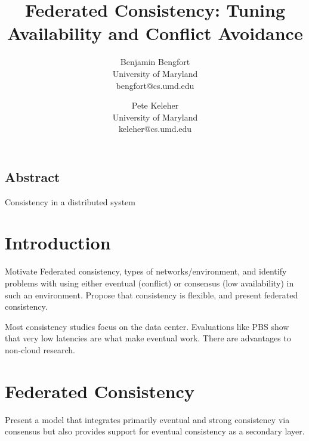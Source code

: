 \documentclass[letterpaper,twocolumn,10pt]{article}
\begin{document}
\date{}

\title{\Large \bf Federated Consistency: Tuning Availability and Conflict Avoidance}

\author{
{\rm Benjamin Bengfort}\\
University of Maryland\\
bengfort@cs.umd.edu
\and
{\rm Pete Keleher}\\
University of Maryland\\
keleher@cs.umd.edu
} %

\maketitle



\subsection*{Abstract}

Consistency in a distributed system

\section{Introduction}

Motivate Federated consistency, types of networks/environment, and identify problems with using either eventual (conflict) or consensus (low availability) in such an environment. Propose that consistency is flexible, and present federated consistency.

Most consistency studies focus on the data center. Evaluations like PBS show that very low latencies are what make eventual work. There are advantages to non-cloud research.

\section{Federated Consistency}

Present a model that integrates primarily eventual and strong consistency via consensus but also provides support for eventual consistency as a secondary layer.
\end{document}
